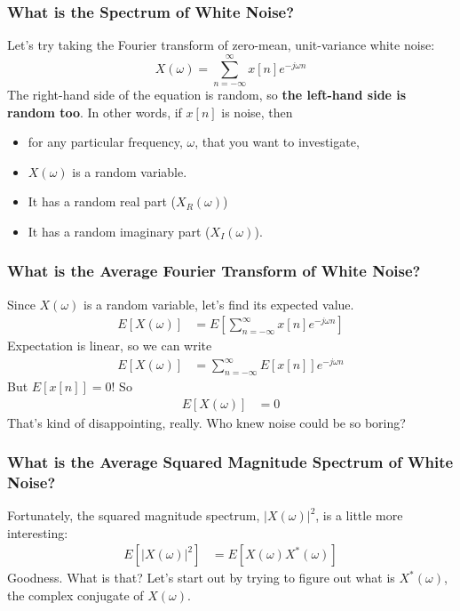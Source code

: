 \documentclass{beamer}
\begin{document}
\begin{frame}
  \frametitle{What is the Spectrum of White Noise?}

  Let's try taking the Fourier transform of zero-mean, unit-variance white noise:
  \begin{displaymath}
    X(\omega) = \sum_{n=-\infty}^{\infty} x[n]e^{-j\omega n}
  \end{displaymath}
  The right-hand side of the equation is random, so {\bf the left-hand
    side is random too}.  In other words, if $x[n]$ is noise, then
  \begin{itemize}
  \item for any particular frequency, $\omega$, that you want to investigate,
  \item $X(\omega)$ is a random variable.
  \item It has a random real part  ($X_R(\omega)$)
  \item It has a random imaginary part  ($X_I(\omega)$).
  \end{itemize}
\end{frame}

\begin{frame}
  \frametitle{What is the Average Fourier Transform of White Noise?}

  Since $X(\omega)$ is a random variable, let's find its expected value.
  \begin{align*}
    E\left[X(\omega)\right] &= E\left[\sum_{n=-\infty}^{\infty} x[n]e^{-j\omega n}\right]
  \end{align*}
  Expectation is linear, so we can write
  \begin{align*}
    E\left[X(\omega)\right] &= \sum_{n=-\infty}^{\infty} E\left[x[n]\right] e^{-j\omega n}
  \end{align*}
  But $E\left[x[n]\right]=0$!  So
  \begin{align*}
    E\left[X(\omega)\right] &= 0
  \end{align*}
  That's kind of disappointing, really.  Who knew noise could be so boring?
\end{frame}

\begin{frame}
  \frametitle{What is the Average Squared Magnitude Spectrum of White Noise?}

  Fortunately, the squared magnitude spectrum, $|X(\omega)|^2$, is a little more interesting:
  \begin{align*}
    E\left[|X(\omega)|^2\right] &=  E\left[X(\omega)X^*(\omega)\right]
  \end{align*}
  Goodness.  What is that?  Let's start out by trying to figure out what is  $X^*(\omega)$, the
  complex conjugate of $X(\omega)$.
\end{frame}
\end{document}
